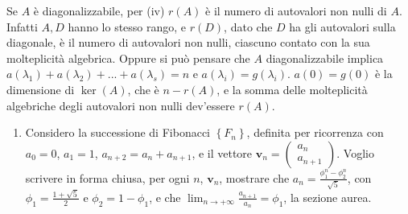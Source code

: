 \documentclass{article}
\begin{document}
Se $A$ \`{e} diagonalizzabile, per (iv) $r\left( A\right) $ \`{e} il numero
di autovalori non nulli di $A$. Infatti $A,D$ hanno lo stesso rango, e $%
r\left( D\right) $, dato che $D$ ha gli autovalori sulla diagonale, \`{e} il
numero di autovalori non nulli, ciascuno contato con la sua molteplicit\`{a}
algebrica. Oppure si pu\`{o} pensare che $A$ diagonalizzabile implica $%
a\left( \lambda _{1}\right) +a\left( \lambda _{2}\right) +...+a\left(
\lambda _{s}\right) =n$ e $a\left( \lambda _{i}\right) =g\left( \lambda
_{i}\right) $. $a\left( 0\right) =g\left( 0\right) $ \`{e} la dimensione di $%
\ker \left( A\right) $, che \`{e} $n-r\left( A\right) $, e la somma delle
molteplicit\`{a} algebriche degli autovalori non nulli dev'essere $r\left(
A\right) $.

\begin{enumerate}
\item Considero la successione di Fibonacci $\left\{ F_{n}\right\} $,
definita per ricorrenza con $a_{0}=0$, $a_{1}=1$, $a_{n+2}=a_{n}+a_{n+1}$, e
il vettore $\mathbf{v}_{n}=\left( 
\begin{array}{c}
a_{n} \\ 
a_{n+1}%
\end{array}%
\right) $. Voglio scrivere in forma chiusa, per ogni $n$, $\mathbf{v}_{n}$,
mostrare che $a_{n}=\frac{\phi _{1}^{n}-\phi _{2}^{n}}{\sqrt{5}}$, con $\phi
_{1}=\frac{1+\sqrt{5}}{2}$ e $\phi _{2}=1-\phi _{1}$, e che $%
\lim_{n\rightarrow +\infty }\frac{a_{n+1}}{a_{n}}=\phi _{1}$, la sezione
aurea.


\end{enumerate}
\end{document}
